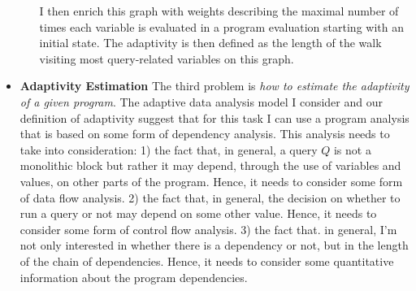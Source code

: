 \begin{itemize}
\begin{enumerate}
   I then enrich this graph with weights describing the maximal number of times each variable is evaluated in a program evaluation starting with an initial state. 
   The adaptivity is then defined as the length of the walk visiting most query-related variables on this graph. 
   \end{enumerate}
\item 
\textbf{Adaptivity Estimation}
The third problem is \emph{how to estimate the adaptivity of a given program}. 
The adaptive data analysis model I consider and our definition of adaptivity suggest that for this task I can use a  program analysis that is based on some form of dependency analysis. This analysis needs to take into consideration:
1) the fact that, in general, a query $Q$ is not a monolithic block but rather it may depend, through the use of variables and values, on other parts of the program. 
Hence, it needs to consider some form of data flow analysis. 
2) the fact that, in general, the decision on whether to run a query or not may depend on some other value. Hence, 
 it needs to consider some form of control flow analysis.
3) the fact that. in general, I'm not only interested in whether there is a dependency or not, but in the length of the chain of dependencies. 
Hence, it needs to consider some quantitative information about the program dependencies. %


\end{itemize}
